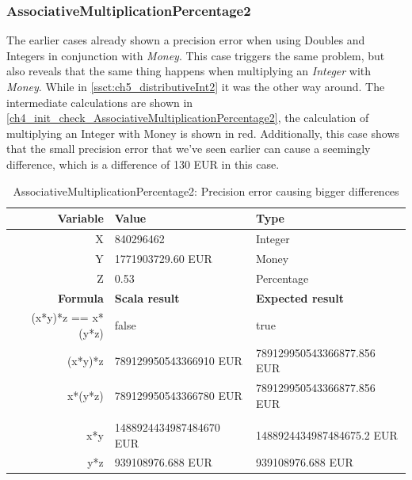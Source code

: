\subsubsection{AssociativeMultiplicationPercentage2}
The earlier cases already shown a precision error when using Doubles and Integers in conjunction with \textit{Money}. This case triggers the same problem, but also reveals that the same thing happens when multiplying an \textit{Integer} with \textit{Money}. While in \autoref{ssct:ch5_distributiveInt2} it was the other way around. The intermediate calculations are shown in \autoref{ch4_init_check_AssociativeMultiplicationPercentage2}, the calculation of multiplying an Integer with Money is shown in red. Additionally, this case shows that the small precision error that we've seen earlier can cause a seemingly difference, which is a difference of 130 EUR in this case.
\FloatBarrier
\begin{table}[!ht]
\centering
\begin{tabular}{rll}
\hline
\textbf{Variable}  & \textbf{Value}          & \textbf{Type}              \\ \hline
X                  & 840296462               & Integer                    \\
Y                  & 1771903729.60 EUR       & Money                      \\
Z                  & 0.53                    & Percentage                 \\ \hline
\textbf{Formula}   & \textbf{Scala result}   & \textbf{Expected result}   \\ \hline
(x*y)*z == x*(y*z) & false                   & true                       \\
(x*y)*z            & 789129950543366910 EUR  & 789129950543366877.856 EUR \\
x*(y*z)            & 789129950543366780 EUR  & 789129950543366877.856 EUR \\
                   &                         &                            \\
x*y                & 1488924434987484670 EUR & 1488924434987484675.2 EUR  \\
y*z                & 939108976.688 EUR       & 939108976.688 EUR          \\ \hline
\end{tabular}
\caption{AssociativeMultiplicationPercentage2: Precision error causing bigger differences}
\label{ch4_init_check_AssociativeMultiplicationPercentage2}
\end{table}
\FloatBarrier

